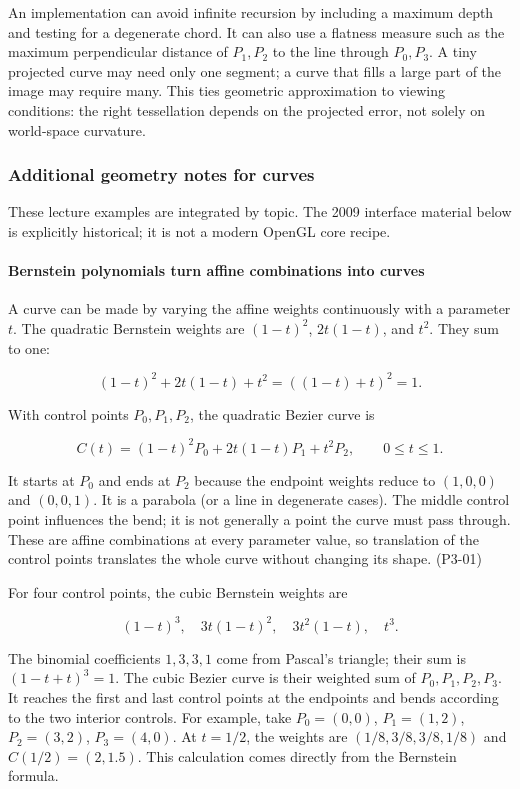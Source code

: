 An implementation can avoid infinite recursion by including a maximum depth and testing for a degenerate chord. It can also use a flatness measure such as the maximum perpendicular distance of \(P_1,P_2\) to the line through \(P_0,P_3\). A tiny projected curve may need only one segment; a curve that fills a large part of the image may require many. This ties geometric approximation to viewing conditions: the right tessellation depends on the projected error, not solely on world-space curvature.

\subsubsection{Additional geometry notes for curves}\label{additional-geometry-notes-for-curves}

These lecture examples are integrated by topic. The 2009 interface material below is explicitly historical; it is not a modern OpenGL core recipe.

\paragraph{Bernstein polynomials turn affine combinations into curves}\label{bernstein-polynomials-turn-affine-combinations-into-curves}

A curve can be made by varying the affine weights continuously with a parameter \(t\). The quadratic Bernstein weights are \((1-t)^2\), \(2t(1-t)\), and \(t^2\). They sum to one:

\[
(1-t)^2+2t(1-t)+t^2=((1-t)+t)^2=1.
\]

With control points \(P_0,P_1,P_2\), the quadratic Bezier curve is

\[
C(t)=(1-t)^2P_0+2t(1-t)P_1+t^2P_2,\qquad 0\leq t\leq1.
\]

It starts at \(P_0\) and ends at \(P_2\) because the endpoint weights reduce to \((1,0,0)\) and \((0,0,1)\). It is a parabola (or a line in degenerate cases). The middle control point influences the bend; it is not generally a point the curve must pass through. These are affine combinations at every parameter value, so translation of the control points translates the whole curve without changing its shape. (P3-01)

For four control points, the cubic Bernstein weights are

\[
(1-t)^3,\quad 3t(1-t)^2,\quad 3t^2(1-t),\quad t^3.
\]

The binomial coefficients \(1,3,3,1\) come from Pascal's triangle; their sum is \((1-t+t)^3=1\). The cubic Bezier curve is their weighted sum of \(P_0,P_1,P_2,P_3\). It reaches the first and last control points at the endpoints and bends according to the two interior controls. For example, take \(P_0=(0,0)\), \(P_1=(1,2)\), \(P_2=(3,2)\), \(P_3=(4,0)\). At \(t=1/2\), the weights are \((1/8,3/8,3/8,1/8)\) and \(C(1/2)=(2,1.5)\). This calculation comes directly from the Bernstein formula.

